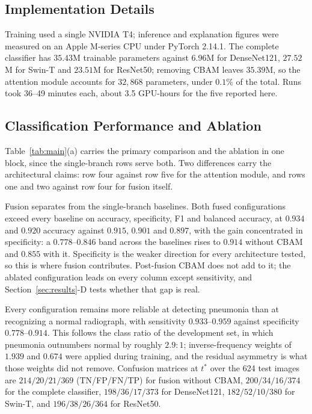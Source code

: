 \documentclass[conference]{IEEEtran}
\begin{document}
\subsection{Implementation Details}
Training used a single NVIDIA T4; inference and explanation figures were
measured on an Apple M-series CPU under PyTorch 2.14.1. The complete
classifier has $35.43$M trainable parameters against $6.96$M for
DenseNet121, $27.52$M for Swin-T and $23.51$M for ResNet50; removing CBAM
leaves $35.39$M, so the attention module accounts for $32{,}868$ parameters,
under $0.1\%$ of the total. Runs took 36--49 minutes each, about 3.5
GPU-hours for the five reported here.

\subsection{Classification Performance and Ablation}
Table~\ref{tab:main}(a) carries the primary comparison and the ablation in
one block, since the single-branch rows serve both. Two differences carry
the architectural claims: row four against row five for the attention
module, and rows one and two against row four for fusion itself.

Fusion separates from the single-branch baselines. Both fused
configurations exceed every baseline on accuracy, specificity, F1 and
balanced accuracy, at $0.934$ and $0.920$ accuracy against $0.915$, $0.901$
and $0.897$, with the gain concentrated in specificity: a $0.778$--$0.846$
band across the baselines rises to $0.914$ without CBAM and $0.855$ with it.
Specificity is the weaker direction for every architecture tested, so this
is where fusion contributes. Post-fusion CBAM does not add to it; the
ablated configuration leads on every column except sensitivity, and
Section~\ref{sec:results}-D tests whether that gap is real.

Every configuration remains more reliable at detecting pneumonia than at
recognizing a normal radiograph, with sensitivity $0.933$--$0.959$ against
specificity $0.778$--$0.914$. This follows the class ratio of the
development set, in which pneumonia outnumbers normal by roughly $2.9{:}1$;
inverse-frequency weights of $1.939$ and $0.674$ were applied during
training, and the residual asymmetry is what those weights did not remove.
Confusion matrices at $t^*$ over the 624 test images are $214/20/21/369$
(TN/FP/FN/TP) for fusion without CBAM, $200/34/16/374$ for the complete
classifier, $198/36/17/373$ for DenseNet121, $182/52/10/380$ for Swin-T, and
$196/38/26/364$ for ResNet50.
\end{document}
